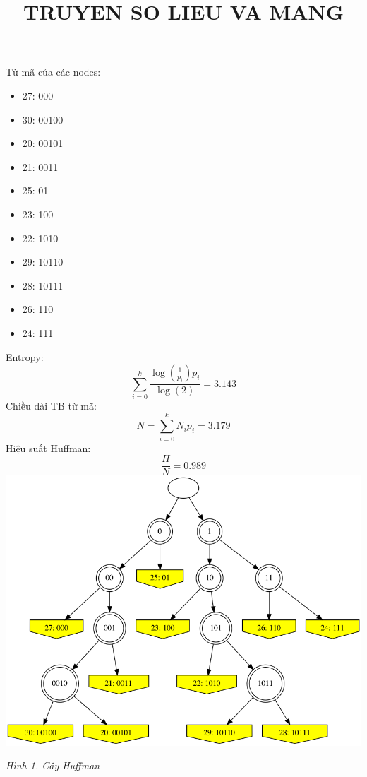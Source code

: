 \documentclass{article}
\title{TRUYEN SO LIEU VA MANG}
\begin{document}
Từ mã của các nodes: 
\begin{itemize}
\item 27: 000
\item 30: 00100
\item 20: 00101
\item 21: 0011
\item 25: 01
\item 23: 100
\item 22: 1010
\item 29: 10110
\item 28: 10111
\item 26: 110
\item 24: 111
\end{itemize}
Entropy:
\[
\sum_{i=0}^{k} \frac{\log{\left(\frac{1}{{p}_{i}} \right)} {p}_{i}}{\log{\left(2 \right)}} = 3.143
\]
Chiều dài TB từ mã:
\[
N = \sum_{i=0}^{k} {N}_{i} {p}_{i} = 3.179
\]
Hiệu suất Huffman:
\[
\frac{H}{N} = 0.989
\]
\includegraphics[width=\textwidth]{graph.png}
\begin{center}
\textit{Hình 1. Cây Huffman}
\end{center}
\end{document}

